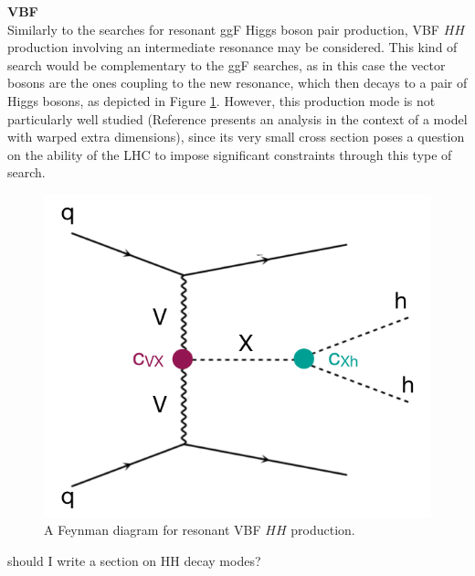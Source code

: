 \noindent\textbf{VBF}\\
\indent Similarly to the searches for resonant ggF Higgs boson pair production, \gls{VBF} $HH$
production involving an intermediate resonance may be considered. This kind of search would be complementary to the ggF searches, as in this case the vector bosons are the ones coupling to the new resonance, which then decays to a pair of Higgs bosons, as depicted in Figure \ref{fig:vbf-resonant}. However, this production mode is not
particularly well studied (Reference \cite{res_vbf} presents an analysis in the context of a model with warped extra dimensions), since its very small cross section poses a question on the ability of the LHC to impose significant constraints through this type of search.

\begin{figure}[!ht]
    \centering
    \includegraphics[width=.55\textwidth]{chapters/chapter1_theory/images/vbf_resonant.png}
    \caption{A Feynman diagram for resonant VBF $HH$ production.}
    \label{fig:vbf-resonant}
\end{figure}

{\color{red} should I write a section on HH decay modes?}